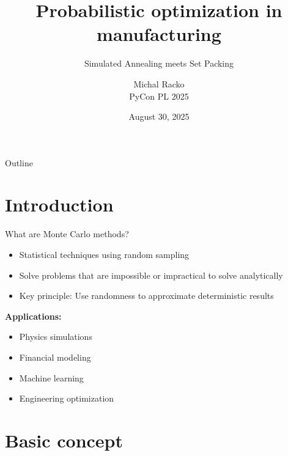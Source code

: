 \documentclass{beamer}
\title{Probabilistic optimization in manufacturing}
\subtitle{Simulated Annealing meets Set Packing}
\author{Michal Racko \\ PyCon PL 2025}
\date{August 30, 2025}
\begin{document}
\begin{frame}
  \titlepage
\end{frame}

\begin{frame}{Outline}
  \tableofcontents
\end{frame}

\section{Introduction}

\begin{frame}{What are Monte Carlo methods?}
  \begin{itemize}
    \item Statistical techniques using random sampling
    \item Solve problems that are impossible or impractical to solve analytically
    \item Key principle: Use randomness to approximate deterministic results
  \end{itemize}
  
  \vspace{0.5cm}
  \textbf{Applications:}
  \begin{itemize}
    \item Physics simulations
    \item Financial modeling
    \item Machine learning
    \item Engineering optimization
  \end{itemize}
\end{frame}

\section{Basic concept}
\end{document}

